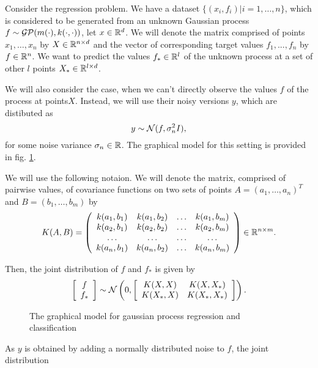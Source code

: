 \label{gp_regression}
Consider the regression problem. We have a dataset $\{(x_i, f_i) | i = 1, \ldots, n\}$, which is considered to be generated from an unknown Gaussian process $f \sim \mathcal{GP}(m(\cdot), k(\cdot, \cdot))$, let $x \in \mathbb{R}^d$.  We will denote the matrix comprised of points $x_1, \ldots, x_n$ by $X \in \mathbb{R}^{n \times d}$ and the vector of corresponding target values $f_1, ..., f_n$ by $f \in \mathbb{R}^n$. We want to predict the values $f_* \in \mathbb{R}^l$ of the unknown process at a set of other $l$ points $X_* \in \mathbb{R}^{l \times d}$.

We will also consider the case, when we can't directly observe the values $f$ of the process at points$X$. Instead, we will use their noisy versions $y$, which are distibuted as
$$y \sim \mathcal{N}(f, \sigma_n^2 I),$$
for some noise variance $\sigma_n \in \mathbb{R}$. The graphical model for this setting is provided in fig. \ref{gp_graphical_model}.

We will use the following notaion. We will denote the matrix, comprised of pairwise values, of covariance functions on two sets of points $A = (a_1, \ldots, a_n)^T$ and $B = (b_1, \ldots, b_m)$ by
$$K(A, B) = 
\left (\begin{array}{cccc} 
	k(a_1, b_1) & k(a_1, b_2) & \ldots & k(a_1, b_m) \\
	k(a_2, b_1) & k(a_2, b_2) & \ldots & k(a_2, b_m) \\
	\ldots & \ldots & \ldots & \ldots \\
	k(a_n, b_1) & k(a_n, b_2) & \ldots & k(a_n, b_m) \\
\end{array} \right) \in \mathbb{R}^{n \times m}.
$$

Then, the joint distribution of $f$ and $f_*$ is given by
$$
\left [ \begin{array}{c} f\\ f_* \end{array} \right ]
\sim
\mathcal{N} \left ( 0, \left [\begin{array}{cc} K(X, X) & K(X, X_*)\\ K(X_*, X) & K(X_*, X_*) \end{array} \right] \right ).
$$

\begin{figure}[!h]
	\centering
	\scalebox{0.9}{
		
	}
	\caption{The graphical model for gaussian process regression and classification}
	\label{gp_graphical_model}
\end{figure}

As $y$ is obtained by adding a normally distributed noise to $f$, the joint distribution

